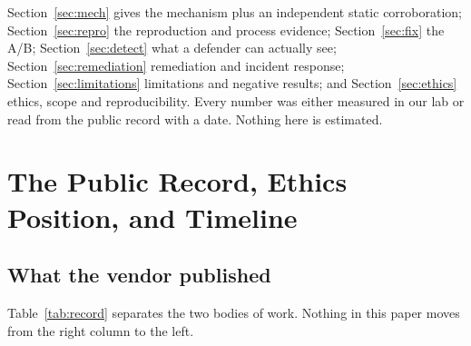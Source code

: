 \documentclass[journal]{IEEEtran}
\begin{document}
Section~\ref{sec:mech} gives the mechanism plus an independent static
corroboration; Section~\ref{sec:repro} the reproduction and process evidence;
Section~\ref{sec:fix} the A/B; Section~\ref{sec:detect} what a defender can
actually see; Section~\ref{sec:remediation} remediation and incident response;
Section~\ref{sec:limitations} limitations and negative results; and
Section~\ref{sec:ethics} ethics, scope and reproducibility. Every number was
either measured in our lab or read from the public record with a date. Nothing
here is estimated.

\section{The Public Record, Ethics Position, and Timeline}
\label{sec:record}

\subsection{What the vendor published}

Table~\ref{tab:record} separates the two bodies of work. Nothing in this paper
moves from the right column to the left.
\end{document}
